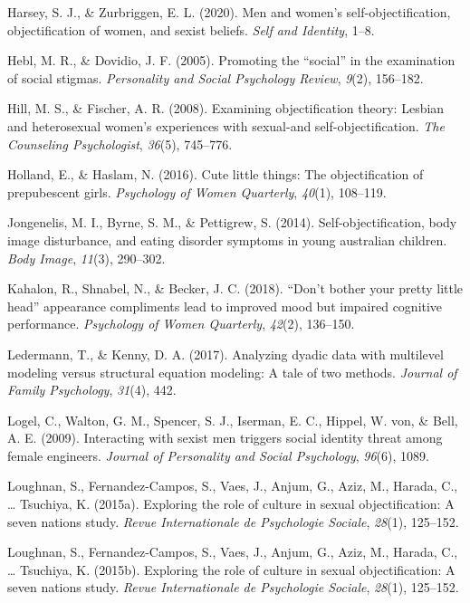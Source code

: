 \documentclass[man]{apa6}
\begin{document}
\hypertarget{ref-harsey2020men}{}
Harsey, S. J., \& Zurbriggen, E. L. (2020). Men and women's
self-objectification, objectification of women, and sexist beliefs.
\emph{Self and Identity}, 1--8.

\hypertarget{ref-hebl2005promoting}{}
Hebl, M. R., \& Dovidio, J. F. (2005). Promoting the ``social'' in the
examination of social stigmas. \emph{Personality and Social Psychology
Review}, \emph{9}(2), 156--182.

\hypertarget{ref-hill2008examining}{}
Hill, M. S., \& Fischer, A. R. (2008). Examining objectification theory:
Lesbian and heterosexual women's experiences with sexual-and
self-objectification. \emph{The Counseling Psychologist}, \emph{36}(5),
745--776.

\hypertarget{ref-holland2016}{}
Holland, E., \& Haslam, N. (2016). Cute little things: The
objectification of prepubescent girls. \emph{Psychology of Women
Quarterly}, \emph{40}(1), 108--119.

\hypertarget{ref-jongenelis2014}{}
Jongenelis, M. I., Byrne, S. M., \& Pettigrew, S. (2014).
Self-objectification, body image disturbance, and eating disorder
symptoms in young australian children. \emph{Body Image}, \emph{11}(3),
290--302.

\hypertarget{ref-kahalon2018don}{}
Kahalon, R., Shnabel, N., \& Becker, J. C. (2018). ``Don't bother your
pretty little head'' appearance compliments lead to improved mood but
impaired cognitive performance. \emph{Psychology of Women Quarterly},
\emph{42}(2), 136--150.

\hypertarget{ref-ledermann2017analyzing}{}
Ledermann, T., \& Kenny, D. A. (2017). Analyzing dyadic data with
multilevel modeling versus structural equation modeling: A tale of two
methods. \emph{Journal of Family Psychology}, \emph{31}(4), 442.

\hypertarget{ref-logel2009interacting}{}
Logel, C., Walton, G. M., Spencer, S. J., Iserman, E. C., Hippel, W.
von, \& Bell, A. E. (2009). Interacting with sexist men triggers social
identity threat among female engineers. \emph{Journal of Personality and
Social Psychology}, \emph{96}(6), 1089.

\hypertarget{ref-loughnan2015exploring}{}
Loughnan, S., Fernandez-Campos, S., Vaes, J., Anjum, G., Aziz, M.,
Harada, C., \ldots{} Tsuchiya, K. (2015a). Exploring the role of culture
in sexual objectification: A seven nations study. \emph{Revue
Internationale de Psychologie Sociale}, \emph{28}(1), 125--152.

\hypertarget{ref-loughnan2015}{}
Loughnan, S., Fernandez-Campos, S., Vaes, J., Anjum, G., Aziz, M.,
Harada, C., \ldots{} Tsuchiya, K. (2015b). Exploring the role of culture
in sexual objectification: A seven nations study. \emph{Revue
Internationale de Psychologie Sociale}, \emph{28}(1), 125--152.
\end{document}
